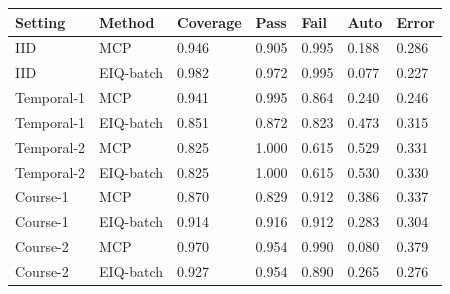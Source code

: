 \begin{tabular}{lllllll}
\toprule
Setting & Method & Coverage & Pass & Fail & Auto & Error\\
\midrule
IID & MCP & 0.946 & 0.905 & 0.995 & 0.188 & 0.286\\
IID & EIQ-batch & 0.982 & 0.972 & 0.995 & 0.077 & 0.227\\
Temporal-1 & MCP & 0.941 & 0.995 & 0.864 & 0.240 & 0.246\\
Temporal-1 & EIQ-batch & 0.851 & 0.872 & 0.823 & 0.473 & 0.315\\
Temporal-2 & MCP & 0.825 & 1.000 & 0.615 & 0.529 & 0.331\\
Temporal-2 & EIQ-batch & 0.825 & 1.000 & 0.615 & 0.530 & 0.330\\
Course-1 & MCP & 0.870 & 0.829 & 0.912 & 0.386 & 0.337\\
Course-1 & EIQ-batch & 0.914 & 0.916 & 0.912 & 0.283 & 0.304\\
Course-2 & MCP & 0.970 & 0.954 & 0.990 & 0.080 & 0.379\\
Course-2 & EIQ-batch & 0.927 & 0.954 & 0.890 & 0.265 & 0.276\\
\bottomrule
\end{tabular}